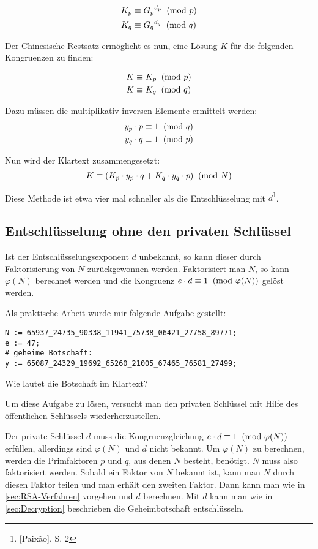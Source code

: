\begin{align*}
K_p &\equiv {G_p} ^ {d_p} \imod{p}\\
K_q &\equiv {G_q} ^ {d_q} \imod{q}
\end{align*}

Der Chinesische Restsatz ermöglicht es nun, eine Lösung $K$ für die 
folgenden Kongruenzen zu finden:

\begin{align*}
K &\equiv K_p \imod{p}\\
K &\equiv K_q \imod{q}
\end{align*}

Dazu müssen die multiplikativ inversen Elemente ermittelt werden:
\begin{align*}
y_p \cdot p \equiv 1 \imod{q}\\
y_q \cdot q \equiv 1 \imod{p}
\end{align*}

Nun wird der Klartext zusammengesetzt:
\[K \equiv (K_p \cdot y_p \cdot q + K_q \cdot y_q \cdot p) \imod{N}\]

Diese Methode ist etwa vier mal schneller als die Entschlüsselung mit $d$\footnote{[Paixão], S. 2}.

\subsection{Entschlüsselung ohne den privaten Schlüssel}
Ist der Entschlüsselungsexponent $d$ unbekannt, so kann dieser durch
Faktorisierung von $N$ zurückgewonnen werden. Faktorisiert man $N$, so 
kann $\varphi(N)$ berechnet werden und die Kongruenz $e \cdot d \equiv 1 \imod{\varphi(N)}$ gelöst werden. 

Als praktische Arbeit wurde mir folgende Aufgabe gestellt:

\begin{mdframed}[tikzsetting={draw=black,very thick}, innertopmargin=0.6cm]
\begin{verbatim}
N := 65937_24735_90338_11941_75738_06421_27758_89771;
e := 47;
# geheime Botschaft:
y := 65087_24329_19692_65260_21005_67465_76581_27499;
\end{verbatim}
Wie lautet die Botschaft im Klartext?
\end{mdframed}

Um diese Aufgabe zu lösen, versucht man den privaten Schlüssel mit 
Hilfe des öffentlichen Schlüssels wiederherzustellen.

Der private Schlüssel $d$ muss die Kongruenzgleichung 
$e \cdot d \equiv 1 \imod{\varphi(N)}$ erfüllen, allerdings sind 
$\varphi(N)$ und $d$ nicht bekannt. Um $\varphi(N)$ zu berechnen, 
werden die Primfaktoren $p$ und $q$, aus denen $N$ besteht, benötigt. 
$N$ muss also faktorisiert werden. Sobald ein Faktor von $N$ bekannt 
ist, kann man $N$ durch diesen Faktor teilen und man erhält den 
zweiten Faktor. Dann kann man wie in \cref{sec:RSA-Verfahren} vorgehen und $d$
berechnen. Mit $d$ kann man wie in \cref{sec:Decryption} beschrieben die
Geheimbotschaft entschlüsseln.


